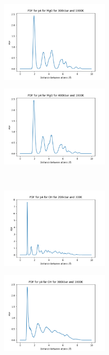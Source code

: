 \documentclass[a4paper,12pt]{article}
\begin{document}
\begin{figure}[h!!!!!!!!!!]
\begin{subfigure}{0.32\textwidth}
		\label{Fig13d}
	\end{subfigure}%
	\begin{subfigure}{0.32\textwidth}
		\centering
		\includegraphics[width=5.5cm]{figures/p4_pdf_MgO_p300_t1800.png}
		\label{Fig13e}
	\end{subfigure}%
	\begin{subfigure}{0.32\textwidth}
		\centering
		\includegraphics[width=5.5cm]{figures/p4_pdf_MgO_p400_t1800.png}
		\label{Fig13f}
	\end{subfigure}%
	\\	
	\begin{subfigure}{0.32\textwidth}
		\centering
		\includegraphics[width=5.5cm]{figures/p4_pdf_OH_p200_t300.png}
		\label{Fig13g}
	\end{subfigure}%
	\begin{subfigure}{0.32\textwidth}
		\centering
		\includegraphics[width=5.5cm]{figures/p4_pdf_OH_p300_t1800.png}

\end{subfigure}
\end{figure}
\end{document}
